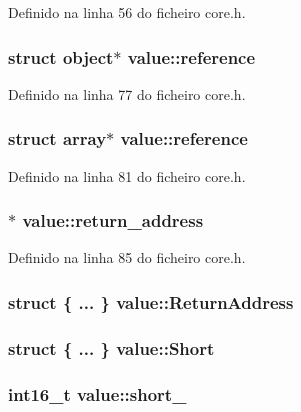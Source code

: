 Definido na linha 56 do ficheiro core.\-h.

\hypertarget{structvalue_ab277933041ff972104180fda5190a425}{
\subsubsection[{reference}]{\setlength{\rightskip}{0pt plus 5cm}struct {\bf object}$\ast$ value\-::reference}}\label{structvalue_ab277933041ff972104180fda5190a425}


Definido na linha 77 do ficheiro core.\-h.

\hypertarget{structvalue_a97a92c9e274a9166f7ae32164a06fe1d}{
\subsubsection[{reference}]{\setlength{\rightskip}{0pt plus 5cm}struct {\bf array}$\ast$ value\-::reference}}\label{structvalue_a97a92c9e274a9166f7ae32164a06fe1d}


Definido na linha 81 do ficheiro core.\-h.

\hypertarget{structvalue_ae154453352d31839cbe33fca89fc98aa}{
\subsubsection[{return\-\_\-address}]{$\ast$ value\-::return\-\_\-address}}\label{structvalue_ae154453352d31839cbe33fca89fc98aa}


Definido na linha 85 do ficheiro core.\-h.

\hypertarget{structvalue_a264ea0eb8eca9c9698c66c7412e8ca88}{
\subsubsection[{Return\-Address}]{\setlength{\rightskip}{0pt plus 5cm}struct \{ ... \}   value\-::\-Return\-Address}}\label{structvalue_a264ea0eb8eca9c9698c66c7412e8ca88}
\hypertarget{structvalue_ac6f6c8288a2314221cd061b264fa25e1}{
\subsubsection[{Short}]{\setlength{\rightskip}{0pt plus 5cm}struct \{ ... \}   value\-::\-Short}}\label{structvalue_ac6f6c8288a2314221cd061b264fa25e1}
\hypertarget{structvalue_a083e8a03606d5b79029794b3d575c021}{
\subsubsection[{short\-\_\-}]{\setlength{\rightskip}{0pt plus 5cm}int16\-\_\-t value\-::short\-\_\-}}\label{structvalue_a083e8a03606d5b79029794b3d575c021}


